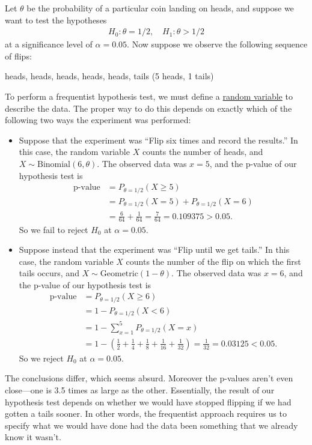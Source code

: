 \begin{example}
  \label{ex:conflicting-results-in-significance-tests}
  Let $\theta$ be the probability of a particular coin landing on heads, and suppose we want to test the hypotheses
  \begin{align}
    H_0: \theta = 1/2, \quad H_1: \theta > 1/2
  \end{align}
  at a significance level of $\alpha = 0.05$. Now suppose we observe the following sequence of flips:
  \begin{center}
    heads, heads, heads, heads, heads, tails \quad (5 heads, 1 tails)
  \end{center}
  
  To perform a frequentist hypothesis test, we must define a \hyperref[prob-def:random-variable]{random variable} to describe the data. The proper way to do this depends on exactly which of the following two ways the experiment was performed:
  
  \begin{itemize}
    \item Suppose that the experiment was ``Flip six times and record the results.'' In this case, the random variable $X$ counts the number of heads, and $X \sim \text{Binomial}(6, \theta)$. The observed data was $x = 5$, and the p-value of our hypothesis test is
    \begin{align}
      \text{p-value} &= P_{\theta=1/2}(X \geq 5) \\
      &= P_{\theta=1/2}(X = 5) + P_{\theta=1/2}(X = 6) \\
      &= \frac{6}{64} + \frac{1}{64} = \frac{7}{64} = 0.109375 > 0.05.
    \end{align}
    So we fail to reject $H_0$ at $\alpha = 0.05$.
    
    \item Suppose instead that the experiment was ``Flip until we get tails.'' In this case, the random variable $X$ counts the number of the flip on which the first tails occurs, and $X \sim \text{Geometric}(1 - \theta)$. The observed data was $x = 6$, and the p-value of our hypothesis test is
    \begin{align}
      \text{p-value} &= P_{\theta=1/2}(X \geq 6) \\
      &= 1 - P_{\theta=1/2}(X < 6) \\
      &= 1 - \sum_{x=1}^{5} P_{\theta=1/2}(X = x) \\
      &= 1 - \left(\frac{1}{2} + \frac{1}{4} + \frac{1}{8} + \frac{1}{16} + \frac{1}{32}\right) = \frac{1}{32} = 0.03125 < 0.05.
    \end{align}
    So we reject $H_0$ at $\alpha = 0.05$.
  \end{itemize}
  
  The conclusions differ, which seems absurd. Moreover the p-values aren't even close---one is 3.5 times as large as the other. Essentially, the result of our hypothesis test depends on whether we would have stopped flipping if we had gotten a tails sooner. In other words, the frequentist approach requires us to specify what we would have done had the data been something that we already know it wasn't. 
\end{example}

